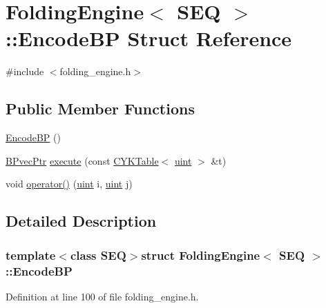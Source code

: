 \hypertarget{struct_folding_engine_1_1_encode_b_p}{\section{Folding\+Engine$<$ S\+E\+Q $>$\+:\+:Encode\+B\+P Struct Reference}
\label{struct_folding_engine_1_1_encode_b_p}
}


{\ttfamily \#include $<$folding\+\_\+engine.\+h$>$}

\subsection*{Public Member Functions}
\begin{DoxyCompactItemize}
\item 
\hyperlink{struct_folding_engine_1_1_encode_b_p_a0d7e23589dd7e4d5bb1519bd889b22b6}{Encode\+B\+P} ()
\item 
\hyperlink{folding__engine_8h_ad0a64ba9a92681778af5917fd1bbd40c}{B\+Pvec\+Ptr} \hyperlink{struct_folding_engine_1_1_encode_b_p_a021b15d01acfeb7a324d64c4d822171b}{execute} (const \hyperlink{class_c_y_k_table}{C\+Y\+K\+Table}$<$ \hyperlink{cyktable_8h_a91ad9478d81a7aaf2593e8d9c3d06a14}{uint} $>$ \&t)
\item 
void \hyperlink{struct_folding_engine_1_1_encode_b_p_a9f177e7e550a01ffbe98ae60ba7691c2}{operator()} (\hyperlink{cyktable_8h_a91ad9478d81a7aaf2593e8d9c3d06a14}{uint} i, \hyperlink{cyktable_8h_a91ad9478d81a7aaf2593e8d9c3d06a14}{uint} j)
\end{DoxyCompactItemize}


\subsection{Detailed Description}
\subsubsection*{template$<$class S\+E\+Q$>$struct Folding\+Engine$<$ S\+E\+Q $>$\+::\+Encode\+B\+P}



Definition at line 100 of file folding\+\_\+engine.\+h.



